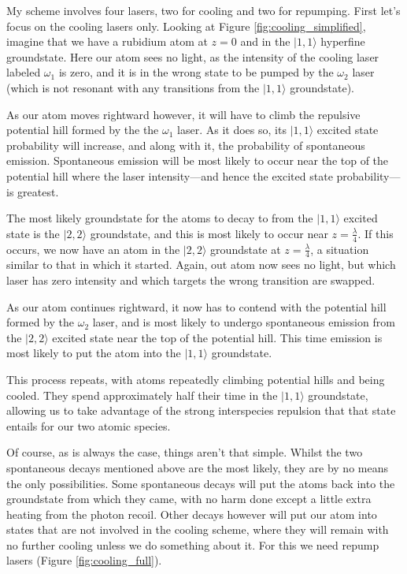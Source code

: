 My scheme involves four lasers, two for cooling and two for repumping. First let's focus on the cooling lasers only. Looking at Figure \ref{fig:cooling_simplified}, imagine that we have a rubidium atom at $z=0$ and in the $|1,1\rangle$ hyperfine groundstate. Here our atom sees no light, as the intensity of the cooling laser labeled $\omega_1$ is zero, and it is in the wrong state to be pumped by the $\omega_2$ laser (which is not resonant with any transitions from the $|1,1\rangle$ groundstate).

As our atom moves rightward however, it will have to climb the repulsive potential hill formed by the the $\omega_1$ laser. As it does so, its $|1,1\rangle$ excited state probability will increase, and along with it, the probability of spontaneous emission. Spontaneous emission will be most likely to occur near the top of the potential hill where the laser intensity---and hence the excited state probability---is greatest.

The most likely groundstate for the atoms to decay to from the $|1,1\rangle$ excited state is the $|2,2\rangle$ groundstate, and this is most likely to occur near $z=\frac\lambda4$. If this occurs, we now have an atom in the $|2,2\rangle$ groundstate at $z=\frac\lambda4$, a situation similar to that in which it started. Again, out atom now sees no light, but which laser has zero intensity and which targets the wrong transition are swapped.

As our atom continues rightward, it now has to contend with the potential hill formed by the $\omega_2$ laser, and is most likely to undergo spontaneous emission from the $|2,2\rangle$ excited state near the top of the potential hill. This time emission is most likely to put the atom into the $|1,1\rangle$ groundstate.

This process repeats, with atoms repeatedly climbing potential hills and being cooled. They spend approximately half their time in the $|1,1\rangle$ groundstate, allowing us to take advantage of the strong interspecies repulsion that that state entails for our two atomic species.

Of course, as is always the case, things aren't that simple. Whilst the two spontaneous decays mentioned above are the most likely, they are by no means the only possibilities. Some spontaneous decays will put the atoms back into the groundstate from which they came, with no harm done except a little extra heating from the photon recoil. Other decays however will put our atom into states that are not involved in the cooling scheme, where they will remain with no further cooling unless we do something about it. For this we need repump lasers (Figure \ref{fig:cooling_full}).

